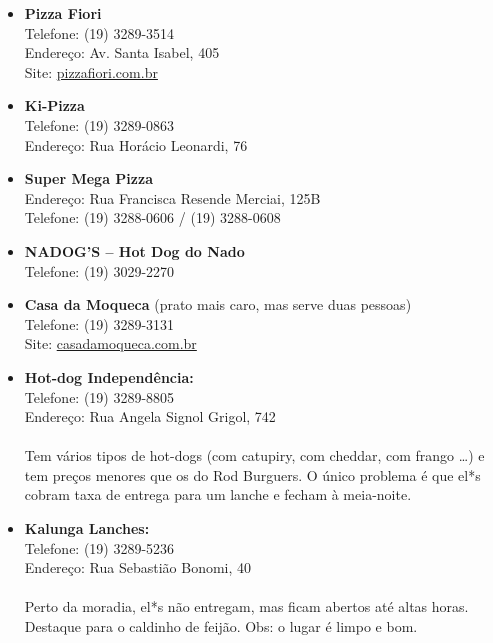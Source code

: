 \begin{itemize}
    \item   \textbf{Pizza Fiori}
        \\Telefone: (19) 3289-3514
        \\Endereço: Av. Santa Isabel, 405
        \\Site: \url{pizzafiori.com.br}

    \item   \textbf{Ki-Pizza}
        \\Telefone: (19) 3289-0863
        \\Endereço: Rua Horácio Leonardi, 76

    \item   \textbf{Super Mega Pizza}
        \\Endereço: Rua Francisca Resende Merciai, 125B
        \\Telefone: (19) 3288-0606 / (19) 3288-0608

    \item   \textbf{NADOG'S -- Hot Dog do Nado}
        \\Telefone: (19) 3029-2270

    \item   \textbf{Casa da Moqueca} (prato mais caro, mas serve duas pessoas)
        \\Telefone: (19) 3289-3131
        \\Site: \url{casadamoqueca.com.br}



    \item   \textbf{Hot-dog Independência:}
        \\Telefone: (19) 3289-8805
        \\Endereço: Rua Angela Signol Grigol, 742
        \\\\
        Tem vários tipos de hot-dogs (com catupiry, com cheddar, com frango
        {\dots}) e tem preços menores que os do Rod Burguers. O único problema é
        que el*s cobram taxa de entrega para um lanche e fecham à meia-noite.

    \item   \textbf{Kalunga Lanches:}
        \\Telefone: (19) 3289-5236
        \\Endereço: Rua Sebastião Bonomi, 40
        \\\\
        Perto da moradia, el*s não entregam, mas ficam abertos até altas horas.
        Destaque para o caldinho de feijão. Obs: o lugar é limpo e bom.


\end{itemize}
